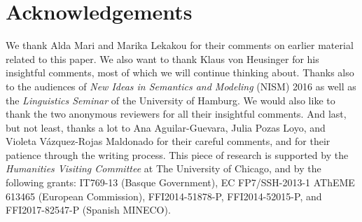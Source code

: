\documentclass[output=paper,
modfonts
]{langscibook}
\begin{document}

\section*{Acknowledgements}
We thank Alda Mari and Marika Lekakou for their comments on earlier material related to this paper. We also want to thank Klaus von Heusinger for his insightful comments, most of which we will continue thinking about. Thanks also to the audiences of \textit{New Ideas in Semantics and Modeling} (NISM) 2016 as well as the \textit{Linguistics Seminar} of the University of Hamburg. We would also like to thank the two anonymous reviewers for all their insightful comments. And last, but not least, thanks a lot to Ana Aguilar-Guevara, Julia Pozas Loyo, and Violeta V\'azquez-Rojas Maldonado for their careful comments, and for their patience through the writing process. This piece of research is supported by the \textit{Humanities Visiting Committee} at The University of Chicago, and by the following grants: IT769-13 (Basque Government), EC FP7/SSH-2013-1 AThEME 613465 (European Commission), FFI2014-51878-P, FFI2014-52015-P, and FFI2017-82547-P (Spanish MINECO).


{\sloppy
\printbibliography[heading=subbibliography,notkeyword=this]
}
\end{document}

